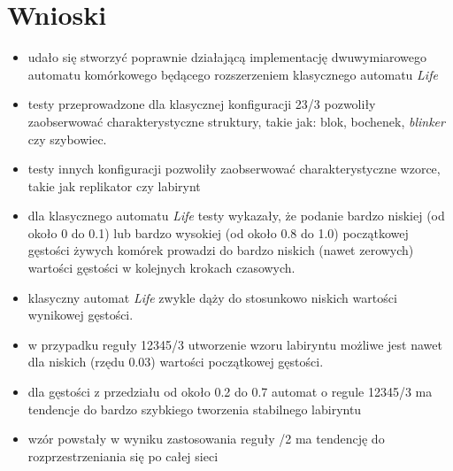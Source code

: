 \documentclass[12pt] {article}
\begin{document}
\section{Wnioski}
\begin{itemize}
\item udało się stworzyć poprawnie działającą implementację dwuwymiarowego automatu komórkowego będącego rozszerzeniem klasycznego automatu \textit{Life}
\item testy przeprowadzone dla klasycznej konfiguracji 23/3 pozwoliły zaobserwować charakterystyczne struktury, takie jak: blok, bochenek, \textit{blinker} czy szybowiec.
\item testy innych konfiguracji pozwoliły zaobserwować charakterystyczne wzorce, takie jak replikator czy labirynt
\item dla klasycznego automatu \textit{Life} testy wykazały, że podanie bardzo niskiej (od około 0 do 0.1) lub bardzo wysokiej (od około 0.8 do 1.0) początkowej gęstości żywych komórek prowadzi do bardzo niskich (nawet zerowych) wartości gęstości w kolejnych krokach czasowych.
\item klasyczny automat \textit{Life} zwykle dąży do stosunkowo niskich wartości wynikowej gęstości.
\item w przypadku reguły 12345/3 utworzenie wzoru labiryntu możliwe jest nawet dla niskich (rzędu 0.03) wartości początkowej gęstości.
\item dla gęstości z przedziału od około 0.2 do 0.7 automat o regule 12345/3 ma tendencje do bardzo szybkiego tworzenia stabilnego labiryntu
\item wzór powstały w wyniku zastosowania reguły /2 ma tendencję do rozprzestrzeniania się po całej sieci
\end{itemize}

\newpage
\end{document}
